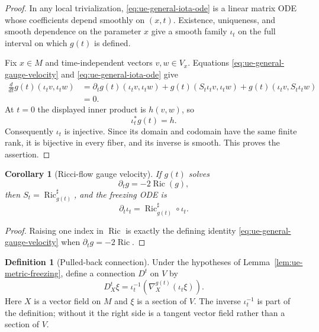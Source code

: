 \documentclass[10pt]{coll-l}
\newtheorem{corollary}[theorem]{Corollary}
\theoremstyle{definition}
\newtheorem{definition}[theorem]{Definition}
\theoremstyle{remark}
\numberwithin{section}{chapter}
\numberwithin{equation}{chapter}
\newcommand{\Ric}{\operatorname{Ric}}
\begin{document}
\begin{proof}
In any local trivialization, \eqref{eq:ue-general-iota-ode} is a linear
matrix ODE whose coefficients depend smoothly on $(x,t)$.  Existence,
uniqueness, and smooth dependence on the parameter $x$ give a smooth family
$\iota_t$ on the full interval on which $g(t)$ is defined.

Fix $x\in M$ and time-independent vectors $v,w\in V_x$.  Equations
\eqref{eq:ue-general-gauge-velocity} and
\eqref{eq:ue-general-iota-ode} give
\begin{align*}
 \frac d{dt}g(t)(\iota_tv,\iota_tw)
 &=\partial_tg(t)(\iota_tv,\iota_tw)
   +g(t)(S_t\iota_tv,\iota_tw)
   +g(t)(\iota_tv,S_t\iota_tw)\\
 &=0.
\end{align*}
At $t=0$ the displayed inner product is $h(v,w)$, so
\begin{equation}
                         \iota_t^*g(t)=h.                \label{eq:ue-frozen-metric}
\end{equation}
Consequently $\iota_t$ is injective.  Since its domain and codomain have
the same finite rank, it is bijective in every fiber, and its inverse is
smooth.  This proves the assertion.
\end{proof}

\begin{corollary}[Ricci-flow gauge velocity]
\label{cor:ue-ricci-gauge-velocity}
If $g(t)$ solves
\[
                         \partial_tg=-2\Ric(g),
\]
then $S_t=\Ric_{g(t)}^\sharp$, and the freezing ODE is
\begin{equation}
       \partial_t\iota_t
          =\Ric_{g(t)}^\sharp\circ\iota_t.               \label{eq:ue-ricci-iota-ode}
\end{equation}
\end{corollary}

\begin{proof}
Raising one index in $\Ric$ is exactly the defining identity
\eqref{eq:ue-general-gauge-velocity} when
$\partial_tg=-2\Ric$.
\end{proof}

\begin{definition}[Pulled-back connection]
\label{def:ue-pulled-connection}
Under the hypotheses of Lemma~\ref{lem:ue-metric-freezing}, define a
connection $D^t$ on $V$ by
\begin{equation}
 D_X^t\xi
   =\iota_t^{-1}\!\left(
        \nabla_X^{g(t)}(\iota_t\xi)
     \right).                                            \label{eq:ue-pulled-connection}
\end{equation}
Here $X$ is a vector field on $M$ and $\xi$ is a section of $V$.  The
inverse $\iota_t^{-1}$ is part of the definition; without it the right side
is a tangent vector field rather than a section of $V$.
\end{definition}
\end{document}
